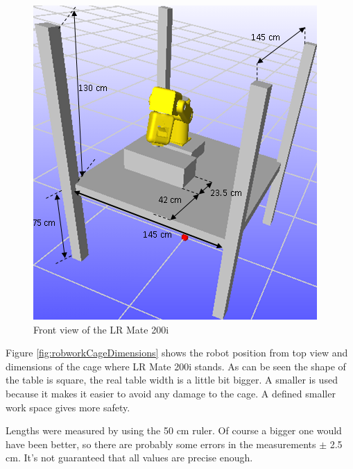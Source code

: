 \begin{figure}[H]
  \centering
  \includegraphics[scale= 0.7]{source/robworkCage.png}
  \caption{Front view of the LR Mate 200i}
  \label{fig:robworkCage}
\end{figure}

Figure \ref{fig:robworkCageDimensions} shows the robot position from top view and dimensions of the cage where LR Mate 200i stands. As can be seen the shape of the table is square, the real table width is a little bit bigger. A smaller is used because it makes it easier to avoid any damage to the cage. A defined smaller work space gives more safety.\newline

Lengths were measured by using the 50 cm ruler. Of course a bigger one would have been better, so there are probably some errors in the measurements $\pm$ 2.5 cm. It's not guaranteed that all values are precise enough.


